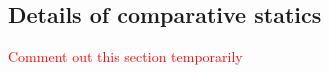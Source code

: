 \documentclass[authoryear, review, 12pt]{elsarticle}
\begin{document}
	\subsection{Details of comparative statics}
	\textcolor{red}{Comment out this section temporarily}
\end{document}
